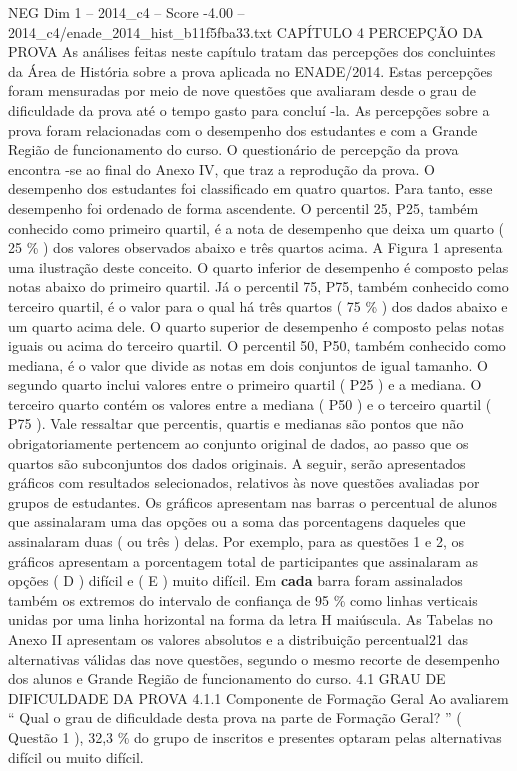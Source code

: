 \begin{textsample}{NEG Dim 1 – 2014\_c4 – Score -4.00 – 2014\_c4/enade\_2014\_hist\_b11f5fba33.txt}  \label{ex:f1_neg_122}
CAPÍTULO 4 PERCEPÇÃO DA PROVA As análises feitas neste capítulo tratam das percepções dos concluintes da Área de História sobre a prova aplicada no ENADE/2014.
Estas percepções foram mensuradas por meio de nove questões que avaliaram desde o grau de dificuldade da prova até o tempo gasto para concluí -la.
As percepções sobre a prova foram relacionadas com o desempenho dos estudantes e com a Grande Região de funcionamento do curso.
O questionário de percepção da prova encontra -se ao final do Anexo IV, que traz a reprodução da prova.
O desempenho dos estudantes foi classificado em quatro quartos.
Para tanto, esse desempenho foi ordenado de forma ascendente.
O percentil 25, P25, também conhecido como primeiro quartil, é a nota de desempenho que deixa um quarto ( 25 \% ) dos valores observados abaixo e três quartos acima.
A Figura 1 apresenta uma ilustração deste conceito.
O quarto inferior de desempenho é composto pelas notas abaixo do primeiro quartil.
Já o percentil 75, P75, também conhecido como terceiro quartil, é o valor para o qual há três quartos ( 75 \% ) dos dados abaixo e um quarto acima dele.
O quarto superior de desempenho é composto pelas notas iguais ou acima do terceiro quartil.
O percentil 50, P50, também conhecido como mediana, é o valor que divide as notas em dois conjuntos de igual tamanho.
O segundo quarto inclui valores entre o primeiro quartil ( P25 ) e a mediana.
O terceiro quarto contém os valores entre a mediana ( P50 ) e o terceiro quartil ( P75 ).
Vale ressaltar que percentis, quartis e medianas são pontos que não obrigatoriamente pertencem ao conjunto original de dados, ao passo que os quartos são subconjuntos dos dados originais.
A seguir, serão apresentados gráficos com resultados selecionados, relativos às nove questões avaliadas por grupos de estudantes.
Os gráficos apresentam nas barras o percentual de alunos que assinalaram uma das opções ou a soma das porcentagens daqueles que assinalaram duas ( ou três ) delas.
Por exemplo, para as questões 1 e 2, os gráficos apresentam a porcentagem total de participantes que assinalaram as opções ( D ) difícil e ( E ) muito difícil.
Em \textbf{cada} barra foram assinalados também os extremos do intervalo de confiança de 95 \% como linhas verticais unidas por uma linha horizontal na forma da letra H maiúscula.
As Tabelas no Anexo II apresentam os valores absolutos e a distribuição percentual21 das alternativas válidas das nove questões, segundo o mesmo recorte de desempenho dos alunos e Grande Região de funcionamento do curso. 4.1 GRAU DE DIFICULDADE DA PROVA 4.1.1 Componente de Formação Geral Ao avaliarem “ Qual o grau de dificuldade desta prova na parte de Formação Geral? ” ( Questão 1 ), 32,3 \% do grupo de inscritos e presentes optaram pelas alternativas difícil ou muito difícil.

\end{textsample}
